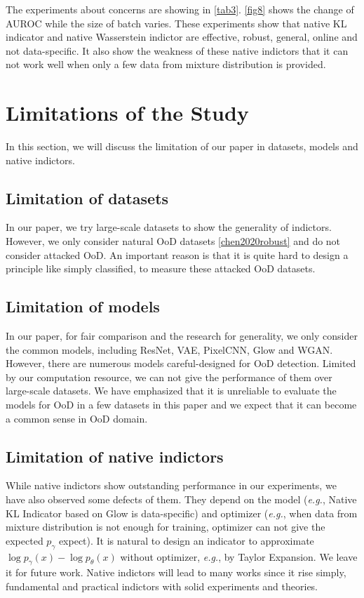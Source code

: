 \documentclass[letterpaper]{article} %
\newcommand{\EG}{\textit{e.g.}, }
\begin{document}
The experiments about concerns are showing in \cref{tab3}. \cref{fig8} shows the change of AUROC while the size of batch varies. These experiments show that native KL indicator and native Wasserstein indictor are effective, robust, general, online and not data-specific. It also show the weakness of these native indictors that it can not work well when only a few data from mixture distribution is provided. 

\section{Limitations of the Study} In this section, we will discuss the limitation of our paper in datasets, models and native indictors. 

\subsection{Limitation of datasets}
In our paper, we try large-scale datasets to show the generality of indictors. However, we only consider natural OoD datasets \cref{chen2020robust} and do not consider attacked OoD. An important reason is that it is quite hard to design a principle like simply classified, to measure these attacked OoD datasets. 

\subsection{Limitation of models} 
In our paper, for fair comparison and the research for generality, we only consider the common models, including ResNet, VAE, PixelCNN, Glow and WGAN. However, there are numerous models careful-designed for OoD detection. Limited by our computation resource, we can not give the performance of them over large-scale datasets. 
We have emphasized that it is unreliable to evaluate the models for OoD in a few datasets in this paper and we expect that it can become a common sense in OoD domain. 

\subsection{Limitation of native indictors} 
While native indictors show outstanding performance in our experiments, we have also observed some defects of them. They depend on the model (\EG Native KL Indicator based on Glow is data-specific) and optimizer (\EG when data from mixture distribution is not enough for training, optimizer can not give the expected $p_\gamma$ expect). It is natural to design an indicator to approximate $\log p_\gamma(x) - \log p_\theta(x)$ without optimizer, \EG by Taylor Expansion. We leave it for future work. 
Native indictors will lead to many works since it rise simply, fundamental and practical indictors with solid experiments and theories. 
\end{document}
